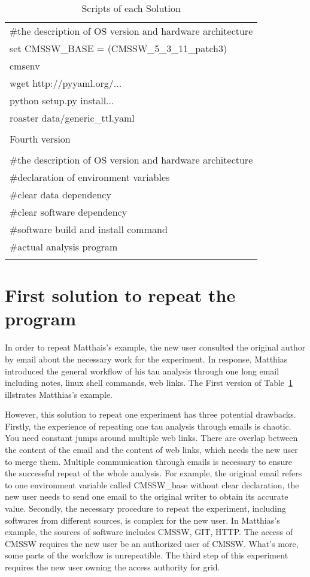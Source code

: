 \documentclass{acm_proc_article-sp}
\begin{document}
\begin{table}
\begin{tabular}{|l|}
        \#the description of OS version and hardware architecture \\
        set CMSSW\_BASE = (CMSSW\_5\_3\_11\_patch3) \\ 
        cmsenv \\
        wget http://pyyaml.org/... \\
        python setup.py install... \\
        roaster data/generic\_ttl.yaml \\
        \\ \hline
        Fourth version \\ \hline
        \\
        \#the description of OS version and hardware architecture \\
        \#declaration of environment variables\\
        \#clear data dependency\\
        \#clear software dependency\\
        \#software build and install command\\
        \#actual analysis program\\ 
        \\ \hline
    \end{tabular}
    \caption{Scripts of each Solution}
    \label{table:scripts}
\end{table}

\section{First solution to repeat the program}
In order to repeat Matthais's example, the new user consulted the original author by email about the necessary work for the experiment. In response, Matthias introduced the general workflow of his tau analysis through one long email including notes, linux shell commands, web links. The First version of Table~\ref{table:scripts} illstrates Matthias's example.

However, this solution to repeat one experiment has three potential drawbacks. Firstly, the experience of repeating one tau analysis through emails is chaotic. You need constant jumps around multiple web links. There are overlap between the content of the email and the content of web links, which needs the new user to merge them. Multiple communication through emails is necessary to ensure the successful repeat of the whole analysis. For example, the original email refers to one environment variable called CMSSW\_base without clear declaration, the new user needs to send one email to the original writer to obtain its accurate value. Secondly, the necessary procedure to repeat the experiment, including softwares from different sources, is complex for the new user. In Matthias's example, the sources of software includes CMSSW, GIT, HTTP. The access of CMSSW requires the new user be an authorized user of CMSSW. What's more, some parts of the workflow is unrepeatible. The third step of this experiment requires the new user owning the access authority for grid. 
\end{document}
